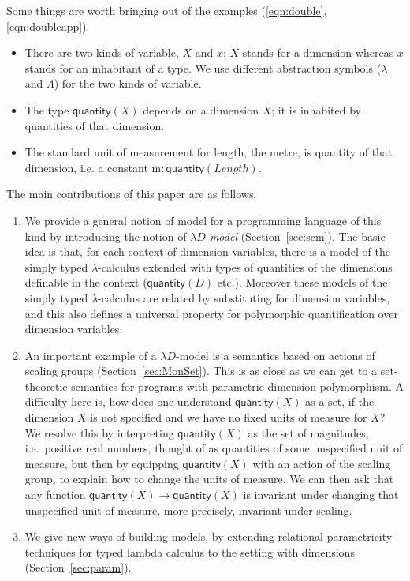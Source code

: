 \documentclass[a4paper,UKenglish]{lipics}
\newcommand{\msf}[1]{\mathsf{#1}} %
\newcommand{\qnt}{\msf{quantity}}
\newcommand{\length}{\mathit{Length}}
\newcommand{\Dvar}{X}
\begin{document}
Some things are worth bringing out of the examples (\eqref{eqn:double},\eqref{eqn:doubleapp}).
\begin{itemize}
\item There are two kinds of variable, $\Dvar$ and $x$;
$\Dvar$ stands for a dimension whereas $x$ stands for an inhabitant of a type.
We use different abstraction symbols ($\lambda$ and $\Lambda$)
for the two kinds of variable.
\item The type $\qnt(\Dvar)$ depends on a dimension $\Dvar$; it
  is inhabited by quantities of that dimension.
\item The standard unit of measurement for length, the metre, is
  quantity of that dimension, i.e. a constant $\mathrm m:\qnt(\length)$.
\end{itemize}

The main contributions of this paper are as follows.
\begin{enumerate}
\item We provide a general notion of model for a programming language
  of this kind by introducing the notion of \emph{$\lambda D$-model}
  (Section~\ref{sec:sem}).
  The basic idea is that, for each context of dimension variables,
  there is a model of the simply typed $\lambda$-calculus extended with
  types of quantities of the dimensions definable in
  the context ($\qnt(D)$ etc.).
  Moreover these models of the simply typed $\lambda$-calculus
  are related by substituting for dimension variables,
  and this also defines a universal property for polymorphic quantification
  over dimension variables.
\item An important example of a $\lambda D$-model is
  a semantics based
  on actions of scaling groups (Section~\ref{sec:MonSet}).
  This is as close as we can get to
  a set-theoretic semantics for programs with parametric dimension polymorphism.
  A difficulty here is, how does one understand $\qnt(\Dvar)$ as a set,
  if the dimension $\Dvar$ is not specified and we have
  no fixed units of measure for $\Dvar$?
  We resolve this by interpreting
  $\qnt(\Dvar)$ as the set of magnitudes, i.e.~positive real numbers,
  thought of as quantities of some unspecified unit of measure,
  but then by equipping $\qnt(\Dvar)$ with an action of the scaling group,
  to explain how to change the units of measure.
  We can then ask that
  any function $\qnt(\Dvar)\to\qnt(\Dvar)$
  is invariant under changing that unspecified unit of measure,
  more precisely, invariant under scaling.
\item We give new ways of building models, by extending
  relational parametricity
  techniques for typed lambda calculus to the setting with
  dimensions (Section~\ref{sec:param}).
\end{enumerate}
\end{document}
